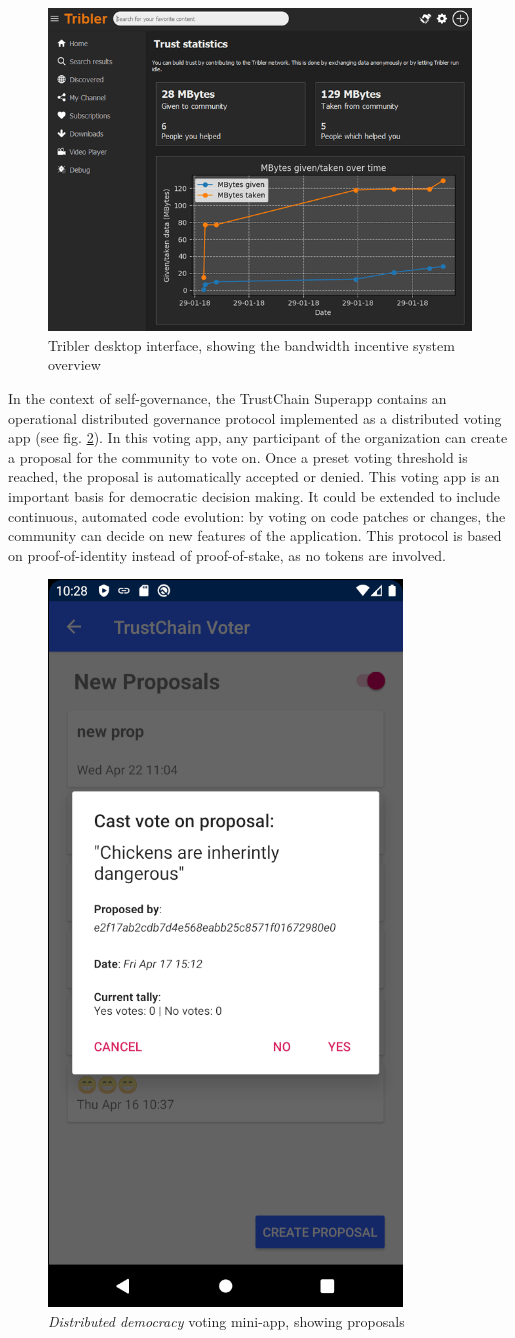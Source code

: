 \begin{figure}
        \includegraphics[width=1\linewidth]{related-work/tribler7.3.0.png}
        \caption{Tribler desktop interface, showing the bandwidth incentive system overview}
        \label{fig:tribler}
    \endminipage
\end{figure}

In the context of self-governance, the TrustChain Superapp contains an operational distributed governance protocol implemented as a distributed voting app (see fig. \ref{fig:trustchain-superapp-voter}). In this voting app, any participant of the organization can create a proposal for the community to vote on. Once a preset voting threshold is reached, the proposal is automatically accepted or denied. This voting app is an important basis for democratic decision making. It could be extended to include continuous, automated code evolution: by voting on code patches or changes, the community can decide on new features of the application. This protocol is based on proof-of-identity instead of proof-of-stake, as no tokens are involved.

\begin{figure}
    \centering
    \includegraphics[width=0.3\linewidth]{related-work/trustchain-superapp-voter.png}
    \caption{\textit{Distributed democracy} voting mini-app, showing proposals}
    \label{fig:trustchain-superapp-voter}
\end{figure}


